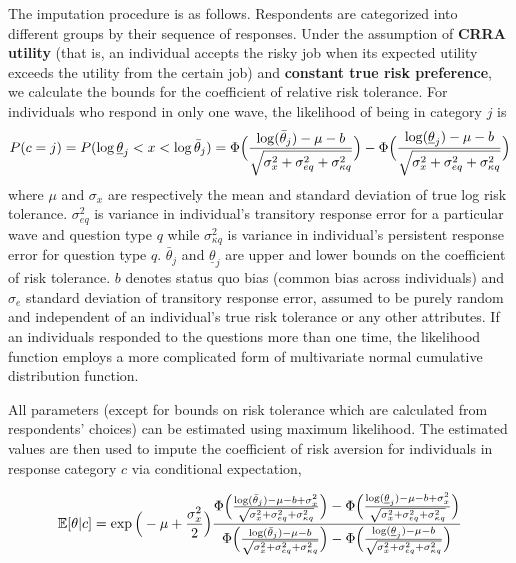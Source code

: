 \documentclass[]{article}
\begin{document}
The imputation procedure is as follows. Respondents are categorized into different groups by their sequence of responses. Under the assumption of \textbf{CRRA utility} (that is, an individual accepts the risky job when its expected utility exceeds the utility from the certain job) and \textbf{constant true risk preference}, we calculate the bounds for the coefficient of relative risk tolerance. For individuals who respond in only one wave, the likelihood of being in category $j$ is 
\begin{equation}
	P(c=j)=P(\log\underline{\theta}_j<x<\log\bar{\theta}_j)=\Phi\Big({\log(\bar{\theta}_j)-\mu-b\over\sqrt{\sigma_x^2+\sigma_{eq}^2+\sigma_{\kappa q}^2}}\Big)-\Phi\Big({\log(\underline{\theta}_j)-\mu-b\over\sqrt{\sigma_x^2+\sigma_{eq}^2+\sigma_{\kappa q}^2}}\Big)
	\label{eq:1-likelihood-function}
\end{equation} 
where $\mu$ and $\sigma_x$ are respectively the mean and standard deviation of true log risk tolerance. $\sigma_{eq}^2$ is variance in individual's transitory response error for a particular wave and question type $q$ while $\sigma_{\kappa q}^2$ is variance in individual's persistent response error for question type $q$. $\bar \theta_j$ and $\underline{\theta}_j$ are upper and lower bounds on the coefficient of risk tolerance. $b$ denotes status quo bias (common bias across individuals) and $\sigma_e$ standard deviation of transitory response error, assumed to be purely random and independent of an individual's true risk tolerance or any other attributes. If an individuals responded to the questions more than one time, the likelihood function employs a more complicated form of multivariate normal cumulative distribution function.

All parameters (except for bounds on risk tolerance which are calculated from respondents' choices) can be estimated using maximum likelihood. The estimated values are then used to impute the coefficient of risk aversion for individuals in response category $c$ via conditional expectation,

\begin{equation}
	\mathbb E[\theta|c]=\exp\Big(-\mu+{\sigma_x^2\over 2}\Big){\Phi\Big({\log(\bar{\theta}_j)-\mu-b+\sigma_x^2\over \sqrt{\sigma_x^2+\sigma_{eq}^2+\sigma_{\kappa q}^2}}\Big)-\Phi\Big({\log(\underline{\theta}_j)-\mu-b+\sigma_x^2\over \sqrt{\sigma_x^2+\sigma_{eq}^2+\sigma_{\kappa q}^2}}\Big)\over \Phi\Big({\log(\bar{\theta}_j)-\mu-b\over \sqrt{\sigma_x^2+\sigma_{eq}^2+\sigma_{\kappa q}^2}}\Big)-\Phi\Big({\log(\underline{\theta}_j)-\mu-b\over \sqrt{\sigma_x^2+\sigma_{eq}^2+\sigma_{\kappa q}^2}}\Big)}
	\label{eq:2-conditional-expectation}
\end{equation}
\end{document}
